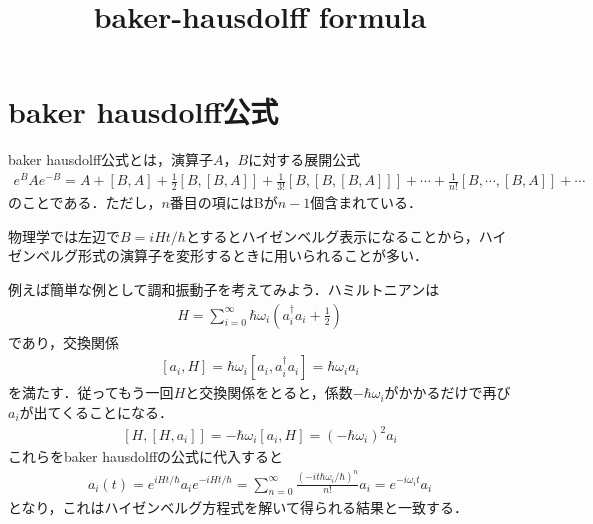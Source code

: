 \documentclass[a4j]{jarticle}
\title{baker-hausdolff formula}
\begin{document}
\section{baker hausdolff公式}
baker hausdolff公式とは，演算子$A$，$B$に対する展開公式
\begin{align*}
 e^{B}Ae^{-B}=A+[B,A]+\frac{1}{2}\left[B,[B,A]\right]+\frac{1}{3!}\left[B,\left[B,[B,A]\right]\right]+\cdots +\frac{1}{n!}\left[B,\cdots,[B,A]\right]+\cdots
\end{align*}
のことである．ただし，$n$番目の項にはBが$n-1$個含まれている．

物理学では左辺で$B=iHt/\hbar$とするとハイゼンベルグ表示になることから，ハイゼンベルグ形式の演算子を変形するときに用いられることが多い．

例えば簡単な例として調和振動子を考えてみよう．ハミルトニアンは
\begin{align*}
 H=\sum_{i=0}^{\infty}\hbar\omega_i\left(a^{\dagger}_ia_i+\frac{1}{2}\right)
\end{align*}
であり，交換関係
\begin{align*}
 \left[a_i,H\right]=\hbar\omega_i\left[a_i,a^{\dagger}_ia_i\right] =\hbar\omega_ia_i
\end{align*}
を満たす．従ってもう一回$H$と交換関係をとると，係数$-\hbar\omega_i$がかかるだけで再び$a_i$が出てくることになる．
\begin{align*}
 \left[H,\left[H,a_i\right]\right]=-\hbar\omega_i\left[a_i,H\right]=\left(-\hbar\omega_i\right)^2a_i
\end{align*}
これらをbaker hausdolffの公式に代入すると
\begin{align*}
 a_i(t)=e^{iHt/\hbar}a_ie^{-iHt/\hbar}=\sum_{n=0}^{\infty}\frac{(-it\hbar\omega_i/\hbar)^n}{n!}a_i=e^{-i\omega_it}a_i
\end{align*}
となり，これはハイゼンベルグ方程式を解いて得られる結果と一致する．
\end{document}

